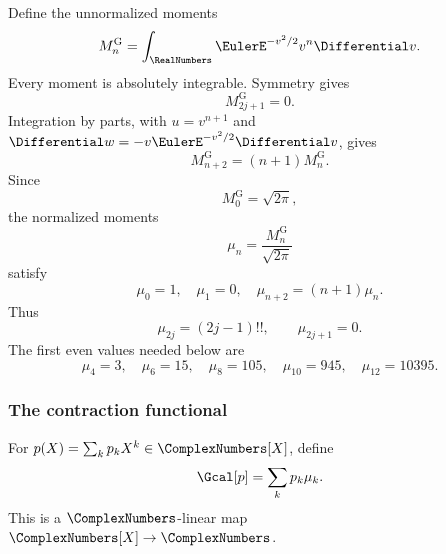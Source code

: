 \documentclass[11pt,oneside]{article}
\theoremstyle{definition}
\theoremstyle{remark}
\begin{document}
Define the unnormalized moments
\begin{equation}
 M_n^{\mathrm G}=\int_{\RealNumbers}\EulerE^{-v^2/2}v^n\Differential v.
 \label{integration:eq:real-gaussian-moment}
\end{equation}
Every moment is absolutely integrable.  Symmetry gives
\begin{equation}
 M_{2j+1}^{\mathrm G}=0.
 \label{integration:eq:gaussian-odd-zero}
\end{equation}
Integration by parts, with $u=v^{n+1}$ and
$\Differential w=-v\EulerE^{-v^2/2}\Differential v$, gives
\begin{equation}
 M_{n+2}^{\mathrm G}=(n+1)M_n^{\mathrm G}.
 \label{integration:eq:gaussian-moment-recurrence}
\end{equation}
Since
\begin{equation}
 M_0^{\mathrm G}=\sqrt{2\pi},
 \label{integration:eq:gaussian-moment-zero}
\end{equation}
the normalized moments
\begin{equation}
 \mu_n=\frac{M_n^{\mathrm G}}{\sqrt{2\pi}}
 \label{integration:eq:normalized-gaussian-moment}
\end{equation}
satisfy
\begin{equation}
 \mu_0=1,
 \quad
 \mu_1=0,
 \quad
 \mu_{n+2}=(n+1)\mu_n.
 \label{integration:eq:normalized-gaussian-recurrence}
\end{equation}
Thus
\begin{equation}
 \mu_{2j}=(2j-1)!!,
 \qquad
 \mu_{2j+1}=0.
 \label{integration:eq:normalized-gaussian-closed}
\end{equation}
The first even values needed below are
\begin{equation}
 \mu_4=3,
 \quad
 \mu_6=15,
 \quad
 \mu_8=105,
 \quad
 \mu_{10}=945,
 \quad
 \mu_{12}=10395.
 \label{integration:eq:gaussian-moments-second-correction}
\end{equation}

\subsubsection{The contraction functional}

For $p(X)=\sum_kp_kX^k\in\ComplexNumbers[X]$, define
\begin{equation}
 \Gcal[p]=\sum_kp_k\mu_k.
 \label{integration:eq:gaussian-contraction-def}
\end{equation}
This is a $\ComplexNumbers$-linear map $\ComplexNumbers[X]\to\ComplexNumbers$.
\end{document}
